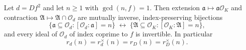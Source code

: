 \begin{theorem}
  \label{infra-glue-coprime}
  Let $d = Df^2$ and let $n \geq 1$ with $\gcd(n, f) = 1$. Then extension
  $\mathfrak{a} \mapsto \mathfrak{a}\mathcal{O}_K$ and contraction
  $\mathfrak{A} \mapsto \mathfrak{A} \cap \mathcal{O}_d$ are mutually inverse,
  index-preserving bijections
  \[
    \{\mathfrak{a} \subseteq \mathcal{O}_d :
      [\mathcal{O}_d : \mathfrak{a}] = n\}
    \;\longleftrightarrow\;
    \{\mathfrak{A} \subseteq \mathcal{O}_K :
      [\mathcal{O}_K : \mathfrak{A}] = n\},
  \]
  and every ideal of $\mathcal{O}_d$ of index coprime to $f$ is invertible.
  In particular
  \[
    r_d(n) = r_d^{\times}(n) = r_D(n) = r_D^{\times}(n).
  \]
\end{theorem}

